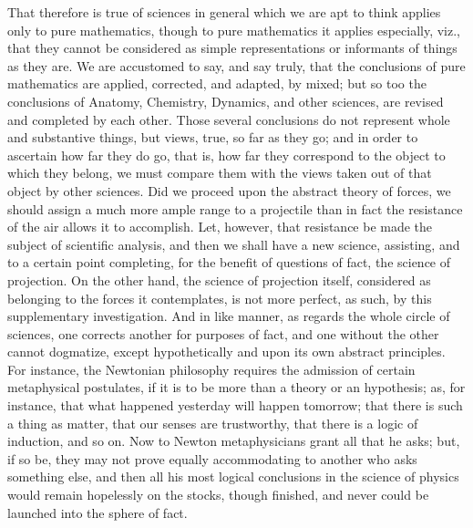 That therefore is true of sciences in general which we are apt to
think applies only to pure mathematics, though to pure mathematics it
applies especially, viz., that they cannot be considered as simple
representations or informants of things as they are. We are accustomed
to say, and say truly, that the conclusions of pure mathematics are
applied, corrected, and adapted, by mixed; but so too the conclusions
of Anatomy, Chemistry, Dynamics, and other sciences, are revised
and completed by each other. Those several conclusions do not
represent whole and substantive things, but views, true, so far as
they go; and in order to ascertain how far they do go, that is, how
far they correspond to the object to which they belong, we must
compare them with the views taken out of that object by other
sciences. Did we proceed upon the abstract theory of forces, we should
assign a much more ample range to a projectile than in fact the
resistance of the air allows it to accomplish. Let, however, that
resistance be made the subject of scientific analysis, and then we
shall have a new science, assisting, and to a certain point
completing, for the benefit of questions of fact, the science of
projection. On the other hand, the science of projection itself,
considered as belonging to the forces it contemplates, is not more
perfect, as such, by this supplementary investigation. And in like
manner, as regards the whole circle of sciences, one corrects another
for purposes of fact, and one without the other cannot dogmatize,
except hypothetically and upon its own abstract principles. For
instance, the Newtonian philosophy requires the admission of certain
metaphysical postulates, if it is to be more than a theory or an
hypothesis; as, for instance, that what happened yesterday will happen
tomorrow; that there is such a thing as matter, that our senses are
trustworthy, that there is a logic of induction, and so on. Now to
Newton metaphysicians grant all that he asks; but, if so be, they may
not prove equally accommodating to another who asks something else,
and then all his most logical conclusions in the science of physics
would remain hopelessly on the stocks, though finished, and never
could be launched into the sphere of fact.

